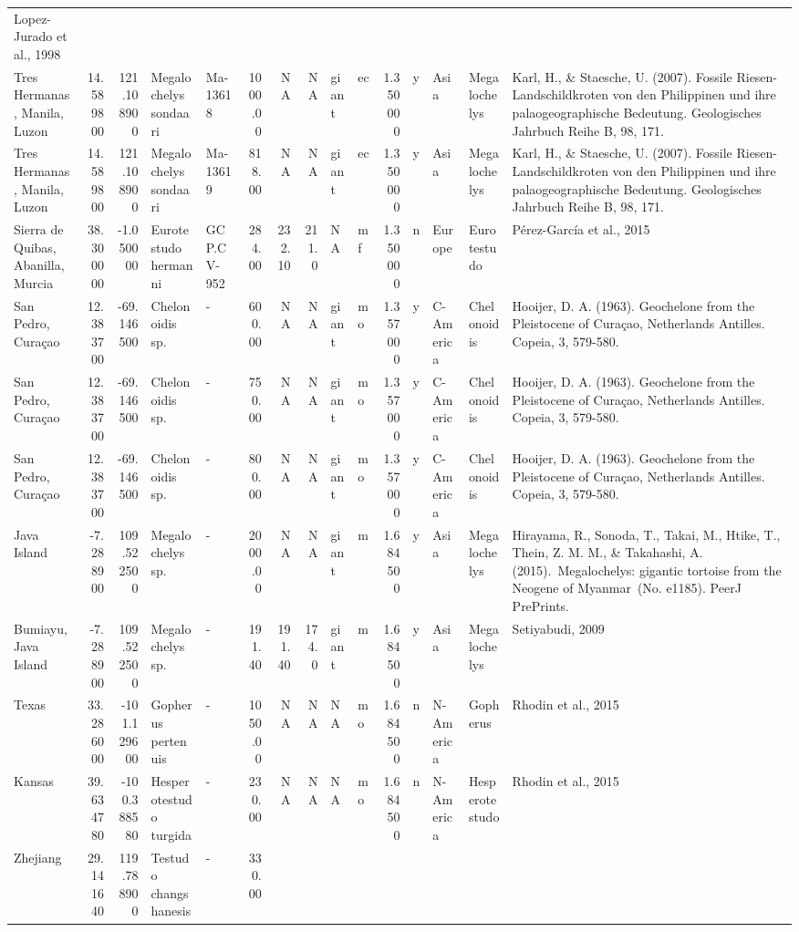 \documentclass[]{article}
\begin{document}
\begin{longtable}[]{@{}lrrllrrrllrllll@{}}
Lopez-Jurado et al., 1998\tabularnewline
Tres Hermanas, Manila, Luzon & 14.589800 & 121.108900 & Megalochelys
sondaari & Ma-13618 & 1000.00 & NA & NA & giant & ec & 1.350000 & y &
Asia & Megalochelys & Karl, H., \& Staesche, U. (2007). Fossile
Riesen-Landschildkroten von den Philippinen und ihre palaogeographische
Bedeutung. Geologisches Jahrbuch Reihe B, 98, 171.\tabularnewline
Tres Hermanas, Manila, Luzon & 14.589800 & 121.108900 & Megalochelys
sondaari & Ma-13619 & 818.00 & NA & NA & giant & ec & 1.350000 & y &
Asia & Megalochelys & Karl, H., \& Staesche, U. (2007). Fossile
Riesen-Landschildkroten von den Philippinen und ihre palaogeographische
Bedeutung. Geologisches Jahrbuch Reihe B, 98, 171.\tabularnewline
Sierra de Quibas, Abanilla, Murcia & 38.300000 & -1.050000 & Eurotestudo
hermanni & GCP.CV-952 & 284.00 & 232.10 & 211.0 & NA & mf & 1.350000 & n
& Europe & Eurotestudo & Pérez-García et al., 2015\tabularnewline
San Pedro, Curaçao & 12.383700 & -69.146500 & Chelonoidis sp. & - &
600.00 & NA & NA & giant & mo & 1.357000 & y & C-America & Chelonoidis &
Hooijer, D. A. (1963). Geochelone from the Pleistocene of Curaçao,
Netherlands Antilles. Copeia, 3, 579-580.\tabularnewline
San Pedro, Curaçao & 12.383700 & -69.146500 & Chelonoidis sp. & - &
750.00 & NA & NA & giant & mo & 1.357000 & y & C-America & Chelonoidis &
Hooijer, D. A. (1963). Geochelone from the Pleistocene of Curaçao,
Netherlands Antilles. Copeia, 3, 579-580.\tabularnewline
San Pedro, Curaçao & 12.383700 & -69.146500 & Chelonoidis sp. & - &
800.00 & NA & NA & giant & mo & 1.357000 & y & C-America & Chelonoidis &
Hooijer, D. A. (1963). Geochelone from the Pleistocene of Curaçao,
Netherlands Antilles. Copeia, 3, 579-580.\tabularnewline
Java Island & -7.288900 & 109.522500 & Megalochelys sp. & - & 2000.00 &
NA & NA & giant & m & 1.684500 & y & Asia & Megalochelys & Hirayama, R.,
Sonoda, T., Takai, M., Htike, T., Thein, Z. M. M., \& Takahashi, A.
(2015).~Megalochelys: gigantic tortoise from the Neogene of Myanmar~(No.
e1185). PeerJ PrePrints.\tabularnewline
Bumiayu, Java Island & -7.288900 & 109.522500 & Megalochelys sp. & - &
191.40 & 191.40 & 174.0 & giant & m & 1.684500 & y & Asia & Megalochelys
& Setiyabudi, 2009\tabularnewline
Texas & 33.286000 & -101.129600 & Gopherus pertenuis & - & 1050.00 & NA
& NA & NA & mo & 1.684500 & n & N-America & Gopherus & Rhodin et al.,
2015\tabularnewline
Kansas & 39.634780 & -100.388580 & Hesperotestudo turgida & - & 230.00 &
NA & NA & NA & mo & 1.684500 & n & N-America & Hesperotestudo & Rhodin
et al., 2015\tabularnewline
Zhejiang & 29.141640 & 119.788900 & Testudo changshanesis & - & 330.00 &

\end{longtable}
\end{document}
